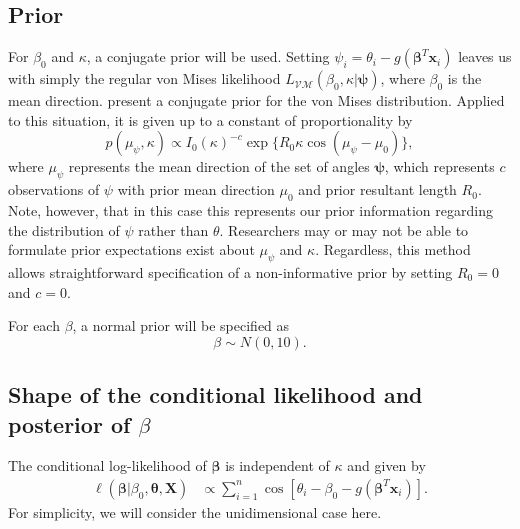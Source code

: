 \documentclass[12pt,a4paper]{article}\usepackage[]{graphicx}\usepackage[]{color}
\begin{document}
\subsection{Prior}

For $\beta_0$ and $\kappa$, a conjugate prior will be used. Setting $\psi_i = \theta_i - g(\boldsymbol\beta^T \boldsymbol{x}_i)$ leaves us with simply the regular von Mises likelihood $L_{\mathcal{VM}}(\beta_0, \kappa \vert \boldsymbol\psi)$, where $\beta_0$ is the mean direction. \citet{guttorp1988finding} present a conjugate prior for the von Mises distribution. Applied to this situation, it is given up to a constant of proportionality by
\begin{equation}
p(\mu_{\psi}, \kappa) \propto  I_0 (\kappa) ^{-c} \exp\{R_0 \kappa \cos (\mu_{\psi} - \mu_0)\},
\end{equation}
where $\mu_{\psi}$ represents the mean direction of the set of angles $\boldsymbol\psi$,  which represents $c$ observations of $\psi$ with prior mean direction $\mu_0$ and prior resultant length $R_0$. Note, however, that in this case this represents our prior information regarding the distribution of $\psi$ rather than $\theta$. Researchers may or may not be able to formulate prior expectations exist about $\mu_{\psi}$ and $\kappa$. Regardless, this method allows straightforward specification of a non-informative prior by setting $R_0 = 0$ and $c = 0$.

For each $\beta$, a normal prior will be specified as
\begin{equation}
\beta \sim N(0, 10).
\end{equation}



\subsection{Shape of the conditional likelihood and posterior of $\beta$}



The conditional log-likelihood of $\boldsymbol{\beta}$ is independent of $\kappa$ and given by
\begin{align}
\ell (\boldsymbol{\beta} \vert \beta_0, \boldsymbol{\theta}, \boldsymbol{X}) &\propto
\sum_{i=1}^{n} \cos \left[ \theta_i - \beta_0 - g(\boldsymbol\beta^T \boldsymbol{x}_i) \right]  .
\end{align}
For simplicity, we will consider the unidimensional case here.
\end{document}
